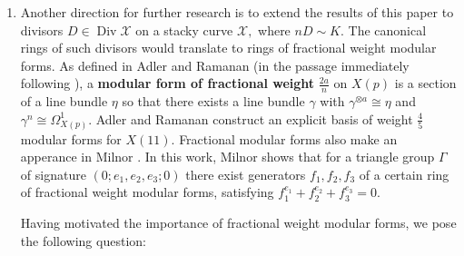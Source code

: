 \documentclass{amsart}
\theoremstyle{plain}
\theoremstyle{definition}
\theoremstyle{remark}
\numberwithin{equation}{section}
\newcommand \sx{\mathscr X}
\DeclareMathOperator\di{Div}
\begin{document}
\begin{enumerate}
	\item Another direction for further research is to extend the results of this paper to divisors $D \in \di \sx$ on a stacky curve $\sx,$ where $nD \sim K.$ The canonical rings of such divisors would translate to rings of fractional weight modular forms. As defined in Adler and Ramanan (in the passage immediately following \cite[Corollary 24.5]{adler:moduli}), a {\bf modular form of fractional weight} $\frac{2a}{n}$ on $X(p)$ is a section of a line bundle $\eta$ so that there exists a line bundle $\gamma$ with $\gamma^{\otimes a} \cong \eta$ and $\gamma^{n} \cong \Omega_{X(p)}^1$. Adler and Ramanan \cite[Appendix 2]{adler:moduli} construct an explicit basis of weight $\frac{4}{5}$ modular forms for $X(11)$. Fractional modular forms also make an apperance in Milnor \cite[$\mathsection$ 6]{milnor:fractional-weight}. In this work, Milnor shows that for a triangle group $\Gamma$ of signature $(0; e_1,e_2,e_3; 0)$ there exist generators $f_1,f_2,f_3$ of a certain ring of fractional weight modular forms, satisfying $f_1^{e_1}+f_2^{e_2}+f_3^{e_3} = 0$. 

Having motivated the importance of fractional weight modular forms, we pose the following question:


\end{enumerate}
\end{document}

